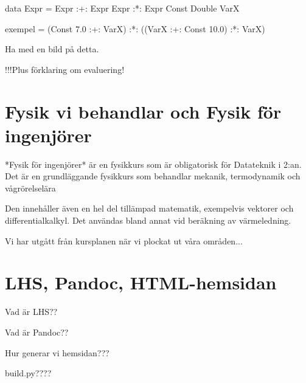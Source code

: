 \begin{binge}
    data Expr = Expr :+: Expr
                Expr :*: Expr
                Const Double
                VarX

    exempel = (Const 7.0 :+: VarX) :*: ((VarX :+: Const 10.0) :*: VarX)

Ha med en bild på detta.

!!!Plus förklaring om evaluering!

\section{Fysik vi behandlar och Fysik för ingenjörer}

*Fysik för ingenjörer* är en fysikkurs som är obligatorisk för Datateknik i 2:an. Det är en grundläggande fysikkurs som behandlar mekanik, termodynamik och vågrörelselära

Den innehåller även en hel del tillämpad matematik, exempelvis vektorer och differentialkalkyl. Det användas bland annat vid beräkning av värmeledning.

Vi har utgått från kursplanen när vi plockat ut våra områden...

\section{LHS, Pandoc, HTML-hemsidan}

Vad är LHS??

Vad är Pandoc??

Hur generar vi hemsidan???

build.py????

\end{binge}
